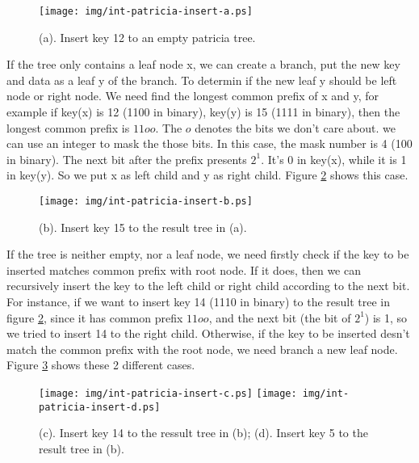 \documentclass{article}
\begin{document}
\begin{figure}[htbp]
       \begin{center}
	\texttt{[image: img/int-patricia-insert-a.ps]}
        \caption{(a). Insert key 12 to an empty patricia tree.}
        \label{fig:int-patricia-insert-a}
       \end{center}
\end{figure}

If the tree only contains a leaf node x, we can create a branch, put the new
key and data as a leaf y of the branch. To determin if the new leaf y
should be left node or right node. We need find the longest common prefix
of x and y, for example if key(x) is 12 (1100 in binary), key(y) is 15
(1111 in binary), then the longest common prefix is $11oo$. The $o$
denotes the bits we don't care about. we can use an integer to mask
the those bits. In this case, the mask number is 4 (100 in binary).
The next bit after the prefix presents $2^1$. It's 0 in key(x), while
it is 1 in key(y). So we put x as left child and y as right
child. Figure \ref{fig:int-patricia-insert-b} shows this case.

\begin{figure}[htbp]
       \begin{center}
	\texttt{[image: img/int-patricia-insert-b.ps]}
        \caption{(b). Insert key 15 to the result tree in (a).}
        \label{fig:int-patricia-insert-b}
       \end{center}
\end{figure}

If the tree is neither empty, nor a leaf node, we need firstly check
if the key to be inserted matches common prefix with root node. If it
does, then we can recursively insert the key to the left child or right child
according to the next bit. For instance, if we want to
insert key 14 (1110 in binary) to the result tree in figure 
\ref{fig:int-patricia-insert-b}, since it has common prefix $11oo$,
and the next bit (the bit of $2^1$) is 1, so we tried to insert 14 to
the right child. Otherwise, if the key to be inserted desn't match the
common prefix with the root node, we need branch a new leaf
node. Figure \ref{fig:int-patricia-insert-c} shows these 2 different cases.

\begin{figure}[htbp]
       \begin{center}
	\texttt{[image: img/int-patricia-insert-c.ps]}
	\texttt{[image: img/int-patricia-insert-d.ps]}
        \caption{(c). Insert key 14 to the ressult tree in (b);
	(d). Insert key 5 to the result tree in (b).}
        \label{fig:int-patricia-insert-c}
       \end{center}
\end{figure}
\end{document}
